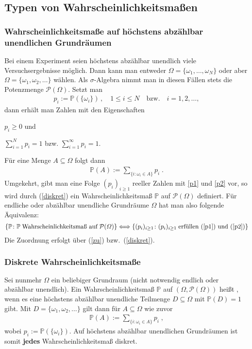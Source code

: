 \documentclass[ngerman,draft,parskip=half,twoside]{scrartcl}
\newcommand*{\highl}[2][]{\textbf{\boldmath{#2}}%
  \ifthenelse{\equal{#1}{}}{\index{#2}}{\index{#1}}%
}
\newcommand*{\PotM}{\mathcal{P}}    %
\newcommand*{\WKM}{\mathbb{P}}      %
\begin{document}
\subsection{Typen von Wahrscheinlichkeitsmaßen}
\subsubsection{Wahrscheinlichkeitsmaße auf höchstens abzählbar unendlichen Grundräumen}
Bei einem Experiment seien höchstens abzählbar unendlich viele Versuchsergebnisse
möglich. Dann kann man entweder $\Omega=\{\omega_1,\ldots,\omega_N\}$ oder
aber $\Omega=\{\omega_1,\omega_2,\ldots\}$ wählen. Als $\sigma$-Algebra nimmt man in diesen
Fällen stets die Potenzmenge $\PotM(\Omega)$. Setzt man
\begin{gather}
\label{zu}
p_i :=\WKM(\{\omega_i\})\,,\quad 1\le i\le N\quad\mbox{bzw.}\quad i=1,2,\ldots,
\end{gather}
dann erhält man Zahlen mit den Eigenschaften
\begin{eigenschaften}
 \item $p_i\ge 0$ und
  \label{p1}
 \item $\sum_{i=1}^N p_i =1$ bzw. $\sum_{i=1}^\infty p_i =1$.
  \label{p2}
\end{eigenschaften}
Für eine Menge $A\subseteq \Omega$ folgt dann
\begin{gather}
\label{diskret}
\WKM(A):= \sum_{\{i\colon \omega_i\in A\}} p_i\;.
\end{gather}
Umgekehrt, gibt man eine Folge $(p_i)_{i\ge 1}$ reeller Zahlen mit \ref{p1} und \ref{p2} vor,
so wird durch (\ref{diskret}) ein Wahrscheinlichkeitsmaß $\WKM$ auf $\PotM(\Omega)$ definiert. Für
endliche oder abzählbar unendliche Grundräume $\Omega$ hat man also folgende Äquivalenz:
\begin{gather*}
  \{\WKM\colon \WKM\;\mbox{Wahrscheinlichkeitsmaß auf}\;\PotM(\Omega)\}
     \Longleftrightarrow\{(p_i)_{i\ge 1}\colon (p_i)_{i\ge 1}\;\mbox{erfüllen (\ref{p1}) und (\ref{p2})}\}
\end{gather*}
Die Zuordnung erfolgt über (\ref{zu}) bzw.~(\ref{diskret}).

\subsubsection{Diskrete Wahrscheinlichkeitsmaße}
Sei nunmehr $\Omega$ ein beliebiger Grundraum (nicht notwendig endlich
oder abzählbar unendlich). Ein Wahrscheinlichkeitsmaß $\WKM$ auf $(\Omega,\PotM(\Omega))$
heißt \highl{diskret}, wenn es eine höchstens abzählbar unendliche Teilmenge $D\subseteq \Omega$
mit $\WKM(D)=1$ gibt. Mit $D=\{\omega_1,\omega_2,\ldots\}$ gilt dann für $A\subseteq \Omega$ wie zuvor
\begin{gather*}
  \WKM(A):= \sum_{\{i\colon \omega_i\in A\}} p_i\;,
\end{gather*}
wobei $p_i:=\WKM(\{\omega_i\})$. Auf höchstens abzählbar unendlichen Grundräumen ist somit \textbf{jedes}
Wahrscheinlichkeitsmaß diskret.
\end{document}
